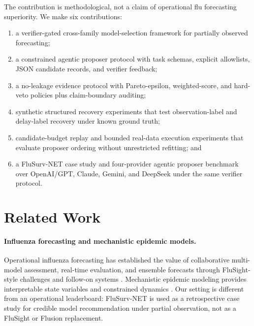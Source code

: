 The contribution is methodological, not a claim of operational flu forecasting
superiority. We make six contributions:
\begin{enumerate}
\item a verifier-gated cross-family model-selection framework for partially
observed forecasting;
\item a constrained agentic proposer protocol with task schemas, explicit
allowlists, JSON candidate records, and verifier feedback;
\item a no-leakage evidence protocol with Pareto-epsilon, weighted-score, and
hard-veto policies plus claim-boundary auditing;
\item synthetic structured recovery experiments that test observation-label
and delay-label recovery under known ground truth;
\item candidate-budget replay and bounded real-data execution experiments that
evaluate proposer ordering without unrestricted refitting; and
\item a FluSurv-NET case study and four-provider agentic proposer benchmark over
OpenAI/GPT, Claude, Gemini, and DeepSeek under the same verifier protocol.
\end{enumerate}

\section{Related Work}

\paragraph{Influenza forecasting and mechanistic epidemic models.}
Operational influenza forecasting has established the value of collaborative
multi-model assessment, real-time evaluation, and ensemble forecasts through
FluSight-style challenges and follow-on systems
\citep{shaman2012forecasting,shaman2013realtime,biggerstaff2016challenge,
mcgowan2019collaborative,reich2019collaborative,reich2019accuracy,
lutz2019pathforward,ray2025flusion}. Mechanistic epidemic modeling provides
interpretable state variables and constrained dynamics
\citep{anderson1991infectious,keeling2008modeling,breto2009mechanistic,
king2016pomp}. Our setting is different from an operational leaderboard:
FluSurv-NET is used as a retrospective case study for credible model
recommendation under partial observation, not as a FluSight or Flusion
replacement.

